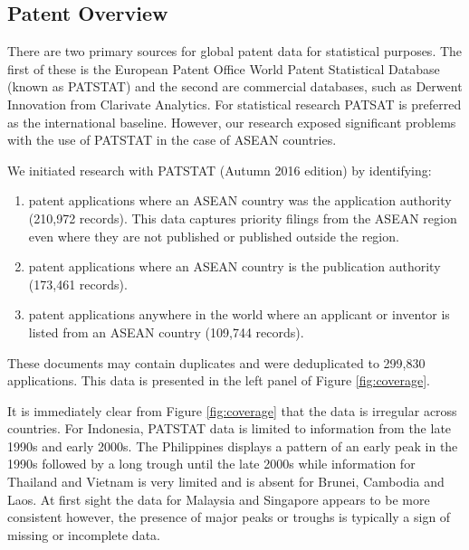 \documentclass[]{book}
\providecommand{\tightlist}{%
  \setlength{\itemsep}{0pt}\setlength{\parskip}{0pt}}
\theoremstyle{definition}
\theoremstyle{definition}
\theoremstyle{definition}
\theoremstyle{remark}
\begin{document}
\hypertarget{patent-overview}{%
\subsection{Patent Overview}\label{patent-overview}}

There are two primary sources for global patent data for statistical
purposes. The first of these is the European Patent Office World Patent
Statistical Database (known as PATSTAT) and the second are commercial
databases, such as Derwent Innovation from Clarivate Analytics. For
statistical research PATSAT is preferred as the international baseline.
However, our research exposed significant problems with the use of
PATSTAT in the case of ASEAN countries.

We initiated research with PATSTAT (Autumn 2016 edition) by identifying:

\begin{enumerate}
\def\labelenumi{\alph{enumi})}
\tightlist
\item
  patent applications where an ASEAN country was the application
  authority (210,972 records). This data captures priority filings from
  the ASEAN region even where they are not published or published
  outside the region.
\item
  patent applications where an ASEAN country is the publication
  authority (173,461 records).
\item
  patent applications anywhere in the world where an applicant or
  inventor is listed from an ASEAN country (109,744 records).
\end{enumerate}

These documents may contain duplicates and were deduplicated to 299,830
applications. This data is presented in the left panel of Figure
\ref{fig:coverage}.

It is immediately clear from Figure \ref{fig:coverage} that the data is
irregular across countries. For Indonesia, PATSTAT data is limited to
information from the late 1990s and early 2000s. The Philippines
displays a pattern of an early peak in the 1990s followed by a long
trough until the late 2000s while information for Thailand and Vietnam
is very limited and is absent for Brunei, Cambodia and Laos. At first
sight the data for Malaysia and Singapore appears to be more consistent
however, the presence of major peaks or troughs is typically a sign of
missing or incomplete data.
\end{document}
